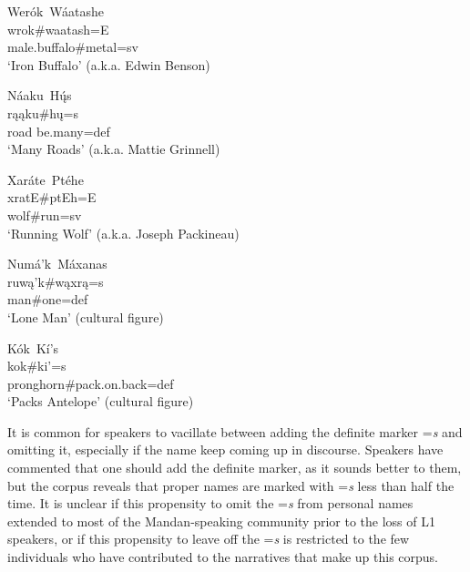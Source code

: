 \begin{exe}
\item\label{ExamplesOfProperNames}

\begin{xlist}

    \item \glll Werók~Wáatashe\\
    wrok\#waatash=E\\
    \textnormal{male.buffalo}\#\textnormal{metal}=sv\\
    \glt `Iron Buffalo' (a.k.a. Edwin Benson)

    
    
    \item \glll Náaku~Hų́s\\
    rąąku\#hų=s\\
    \textnormal{road} \textnormal{be.many}=def\\
    \glt `Many Roads' (a.k.a. Mattie Grinnell)
    
    \item \glll Xaráte~Ptéhe\\
    xratE\#ptEh=E\\
    \textnormal{wolf}\#\textnormal{run}=sv\\
    \glt `Running Wolf' (a.k.a. Joseph Packineau)
    
    \item \glll Numá'k~Máxanas\\
    ruwą'k\#wąxrą=s\\
    \textnormal{man}\#\textnormal{one}=def\\
    \glt `Lone Man' (cultural figure)
    
    \item \glll Kók~Kí's\\
    kok\#ki'=s\\
    \textnormal{pronghorn}\#\textnormal{pack.on.back}=def\\
    \glt `Packs Antelope' (cultural figure)
    
\end{xlist}
    
\end{exe}

It is common for speakers to vacillate between adding the definite marker =\textit{s} and omitting it, especially if the name keep coming up in discourse. Speakers have commented that one should add the definite marker, as it sounds better to them, but the corpus reveals that proper names are marked with =\textit{s} less than half the time. It is unclear if this propensity to omit the =\textit{s} from personal names extended to most of the Mandan-speaking community prior to the loss of L1 speakers, or if this propensity to leave off the =\textit{s} is restricted to the few individuals who have contributed to the narratives that make up this corpus.

